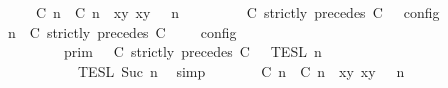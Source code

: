 \begin{isabellebody}
\ \ \ \ {\isacharequal}\ {\isasymlbrakk}\ {\isacharparenleft}{\isacharparenleft}{\isasymlceil}{\isacharhash}\isactrlsup {\isasymle}\ C\ n{\isacharcomma}\ {\isacharhash}\isactrlsup {\isacharless}\ C\ n{\isasymrceil}\ {\isasymin}\ {\isacharparenleft}{\isasymlambda}{\isacharparenleft}x{\isacharcomma}y{\isacharparenright}{\isachardot}\ x{\isasymle}y{\isacharparenright}{\isacharparenright}\ {\isacharhash}\ {\isasymGamma}{\isacharparenright}{\isacharcomma}\ n\isanewline
\ \ \ \ \ \ {\isasymturnstile}\ {\isasymPsi}\ {\isasymtriangleright}\ {\isacharparenleft}{\isacharparenleft}C\ strictly\ precedes\ C\ {\isacharhash}\ {\isasymPhi}{\isacharparenright}\ {\isasymrbrakk}\isactrlsub c\isactrlsub o\isactrlsub n\isactrlsub f\isactrlsub i\isactrlsub g{\isacartoucheclose}\isanewline
%
\isadelimproof
%
\endisadelimproof
%
\isatagproof
{}\isamarkupfalse%
\ {\isacharminus}\isanewline
\ \ \isamarkupfalse%
\ {\isacartoucheopen}{\isasymlbrakk}\ {\isasymGamma}{\isacharcomma}\ n\ {\isasymturnstile}\ {\isacharparenleft}C\ strictly\ precedes\ C\ {\isacharhash}\ {\isasymPsi}\ {\isasymtriangleright}\ {\isasymPhi}\ {\isasymrbrakk}\isactrlsub c\isactrlsub o\isactrlsub n\isactrlsub f\isactrlsub i\isactrlsub g\isanewline
\ \ \ \ \ \ \ \ {\isacharequal}\ {\isasymlbrakk}{\isasymlbrakk}\ {\isasymGamma}\ {\isasymrbrakk}{\isasymrbrakk}\isactrlsub p\isactrlsub r\isactrlsub i\isactrlsub m\ {\isasyminter}\ {\isasymlbrakk}{\isasymlbrakk}\ {\isacharparenleft}C\ strictly\ precedes\ C\ {\isacharhash}\ {\isasymPsi}\ {\isasymrbrakk}{\isasymrbrakk}\isactrlsub T\isactrlsub E\isactrlsub S\isactrlsub L\isactrlbsup {\isasymge}\ n\isactrlesup \isanewline
\ \ \ \ \ \ \ \ \ \ {\isasyminter}\ {\isasymlbrakk}{\isasymlbrakk}\ {\isasymPhi}\ {\isasymrbrakk}{\isasymrbrakk}\isactrlsub T\isactrlsub E\isactrlsub S\isactrlsub L\isactrlbsup {\isasymge}\ Suc\ n\isactrlesup {\isacartoucheclose}\ \isamarkupfalse%
\ simp\isanewline
\ \ \isamarkupfalse%
\ \isamarkupfalse%
\ {\isacartoucheopen}{\isasymlbrakk}\ {\isacharparenleft}{\isacharparenleft}{\isasymlceil}{\isacharhash}\isactrlsup {\isasymle}\ C\ n{\isacharcomma}\ {\isacharhash}\isactrlsup {\isacharless}\ C\ n{\isasymrceil}\ {\isasymin}\ {\isacharparenleft}{\isasymlambda}{\isacharparenleft}x{\isacharcomma}y{\isacharparenright}{\isachardot}\ x{\isasymle}y{\isacharparenright}{\isacharparenright}\ {\isacharhash}\ {\isasymGamma}{\isacharparenright}{\isacharcomma}\ n\isanewline

\end{isabellebody}
